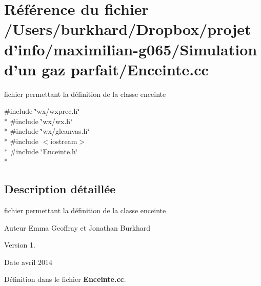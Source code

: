 \section{Référence du fichier /\+Users/burkhard/\+Dropbox/projet d'info/maximilian-\/g065/\+Simulation d'un gaz parfait/\+Enceinte.cc}
\label{_enceinte_8cc}


fichier permettant la définition de la classe enceinte  


{\ttfamily \#include \char`\"{}wx/wxprec.\+h\char`\"{}}\\*
{\ttfamily \#include \char`\"{}wx/wx.\+h\char`\"{}}\\*
{\ttfamily \#include \char`\"{}wx/glcanvas.\+h\char`\"{}}\\*
{\ttfamily \#include $<$iostream$>$}\\*
{\ttfamily \#include \char`\"{}Enceinte.\+h\char`\"{}}\\*


\subsection{Description détaillée}
fichier permettant la définition de la classe enceinte 

\begin{DoxyAuthor}{Auteur}
Emma Geoffray et Jonathan Burkhard 
\end{DoxyAuthor}
\begin{DoxyVersion}{Version}
1. 
\end{DoxyVersion}
\begin{DoxyDate}{Date}
avril 2014 
\end{DoxyDate}


Définition dans le fichier {\bf Enceinte.\+cc}.

